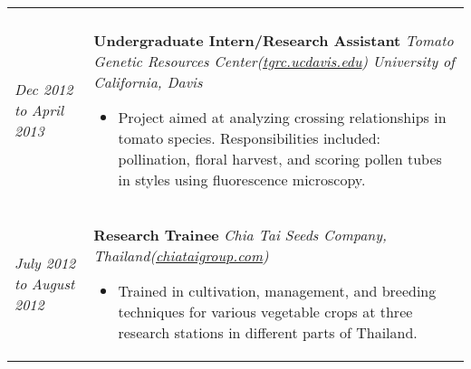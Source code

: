\documentclass[a4paper]{article}
\begin{document}
\begin{tabular}{p{3cm} p{14cm}}
\begin{itemize}[noitemsep,topsep=0pt]
\end{itemize}
%
\\
%
\vspace{0pt} 
\textit{Dec 2012}\newline
\textit{to}\newline
\textit{April 2013}\newline
&
\vspace{0pt}
\textbf{Undergraduate Intern/Research Assistant}\newline
\textit{Tomato Genetic Resources Center(\href{http://tgrc.ucdavis.edu/}{tgrc.ucdavis.edu})}\newline
\textit{University of California, Davis}
\begin{itemize}[noitemsep,topsep=0pt]
  \item Project aimed at analyzing crossing relationships in tomato species. Responsibilities included: pollination, floral harvest, and scoring pollen tubes in styles using fluorescence microscopy.
\end{itemize}
%
\\
%
\vspace{0pt} 
\textit{July 2012}\newline
\textit{to}\newline
\textit{August 2012}\newline
&
\vspace{0pt}
\textbf{Research Trainee}\newline
\textit{Chia Tai Seeds Company, Thailand(\href{http://www.chiataigroup.com/AboutUs.aspx}{chiataigroup.com})}\newline
\begin{itemize}[noitemsep,topsep=0pt]
  \item Trained in cultivation, management, and breeding techniques for various vegetable crops at three research stations in different parts of Thailand.
\end{itemize}
\end{tabular}
\end{document}

